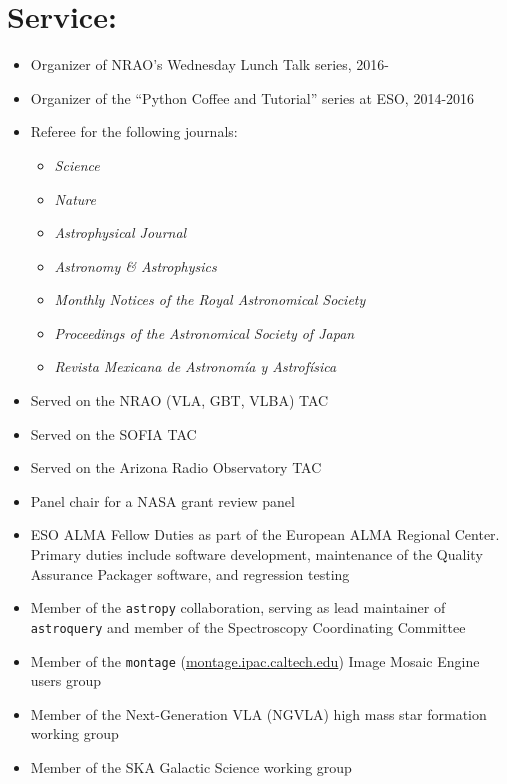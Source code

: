 
\section*{Service:}
\vspace{-10pt}
\begin{itemize}
\itemsep-3pt
        
    \item Organizer of NRAO's Wednesday Lunch Talk series, 2016-
    \item Organizer of the ``Python Coffee and Tutorial'' series at ESO, 2014-2016
    \item Referee for the following journals:
        \begin{itemize}
            \itemsep-3pt
            \item \textit{Science}
            \item \textit{Nature}
            \item \textit{Astrophysical Journal}
            \item \textit{Astronomy \& Astrophysics}
            \item \textit{Monthly Notices of the Royal Astronomical Society}
            \item \textit{Proceedings of the Astronomical Society of Japan}
            \item \textit{Revista Mexicana de Astronom{\'i}a y Astrof{\'i}sica}
    \end{itemize}
    \item Served on the NRAO (VLA, GBT, VLBA) TAC
    \item Served on the SOFIA TAC
    \item Served on the Arizona Radio Observatory TAC
    \item Panel chair for a NASA grant review panel
    \item ESO ALMA Fellow Duties as part of the European ALMA Regional Center.
        Primary duties include software development, maintenance of the
        Quality Assurance Packager software, and regression testing
    \item Member of the \texttt{astropy} collaboration, serving as lead maintainer
        of \texttt{astroquery} and member of the Spectroscopy Coordinating Committee
    \item Member of the \texttt{montage} (\url{montage.ipac.caltech.edu}) Image
        Mosaic Engine users group
    \item Member of the Next-Generation VLA (NGVLA) high mass star formation
        working group
    \item Member of the SKA Galactic Science
        working group
\end{itemize}
